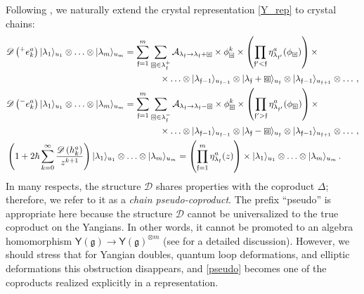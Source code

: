 \documentclass[10pt]{article}
\theoremstyle{definition}
\def\CA{{\cal A}}
\def\ff{\mathfrak{f}}
\def\fg{\mathfrak{g}}
\def\myY{{\mathsf{Y}}}
\def\sD{{\mathscr{D}}}
\def\lm{\limits}
\numberwithin{equation}{section}
\newcommand\sqbox[1]{{
		\setbox0=\hbox{\mbox{$\Box$}}
		\setbox1=\hbox{\mbox{\raisebox{0.35ex}{\small #1}}}
		\mbox{\raisebox{-0.2ex}{\rlap{\hbox to \wd0{\hss{\box1}\hss}}\box0}}
}}
\newcommand\ssqbox[1]{{
		\setbox0=\hbox{\mbox{$\scriptstyle\Box$}}
		\setbox1=\hbox{\mbox{\raisebox{0.35ex}{\tiny #1}}}
		\mbox{\raisebox{-0.2ex}{\rlap{\hbox to \wd0{\hss{\box1}\hss}}\box0}}
}}
\begin{document}
Following \cite{Galakhov:2022uyu}, we naturally extend the crystal representation \eqref{Y_rep} to crystal chains:
\begin{equation}\label{pseudo}
	\begin{aligned}
		&\sD\left({}^{+} e_k^{a}\right)|\lambda_1\rangle_{u_1}\otimes\ldots\otimes|\lambda_m\rangle_{u_m}=\sum\lm_{\ff=1}^m\sum\lm_{\ssqbox{$a$}\in\lambda^{+}_{\ff}}\CA_{\lambda_{\ff}\to\lambda_{\ff}+\ssqbox{$a$}}\times\phi_{\ssqbox{$a$}}^k\times\left(\prod\lm_{\ff'<\ff}\eta_{\lambda_{\ff'}}^a(\phi_{\ssqbox{$a$}})\right)\times\\
		&\hspace{6cm}\times\ldots\otimes|\lambda_{\ff-1}\rangle_{u_{\ff-1}}\otimes|\lambda_{\ff}+\sqbox{$a$}\rangle_{u_{\ff}}\otimes |\lambda_{\ff-1}\rangle_{u_{\ff+1}}\otimes\ldots\,,\\
		&\sD\left({}^{-} e_k^{a}\right)|\lambda_1\rangle_{u_1}\otimes\ldots\otimes|\lambda_m\rangle_{u_m}=\sum\lm_{\ff=1}^m\sum\lm_{\ssqbox{$a$}\in\lambda^{-}_{\ff}}\CA_{\lambda_{\ff}\to\lambda_{\ff}-\ssqbox{$a$}}\times\phi_{\ssqbox{$a$}}^k\times\left(\prod\lm_{\ff'>\ff}\eta_{\lambda_{\ff'}}^a(\phi_{\ssqbox{$a$}})\right)\times\\
		&\hspace{6cm}\times\ldots\otimes|\lambda_{\ff-1}\rangle_{u_{\ff-1}}\otimes|\lambda_{\ff}-\sqbox{$a$}\rangle_{u_{\ff}}\otimes |\lambda_{\ff-1}\rangle_{u_{\ff+1}}\otimes\ldots\,,\\
		& \left(1+2\hbar\sum\lm_{k=0}^{\infty}\frac{\sD\left(h_k^a\right)}{z^{k+1}}\right)|\lambda_1\rangle_{u_1}\otimes\ldots\otimes|\lambda_m\rangle_{u_m}=\left(\prod\lm_{\ff=1}^m\eta_{\lambda_\ff}^a(z)\right)\times|\lambda_1\rangle_{u_1}\otimes\ldots\otimes|\lambda_m\rangle_{u_m}\,.
	\end{aligned}	
\end{equation}
In many respects, the structure $\sD$ shares properties with the coproduct $\Delta$; therefore, we refer to it as a \emph{chain pseudo-coproduct}.
The prefix ``pseudo'' is appropriate here because the structure $\sD$ cannot be universalized to the true coproduct on the Yangians.
In other words, it cannot be promoted to an algebra homomorphism $\myY(\fg)\to \myY(\fg)^{\otimes m}$ (see \cite[Sec.~3.1]{Galakhov:2022uyu} for a detailed discussion).
However, we should stress that for Yangian doubles, quantum loop deformations, and elliptic deformations this obstruction disappears, and \eqref{pseudo} becomes one of the coproducts realized explicitly in a representation.
\end{document}
